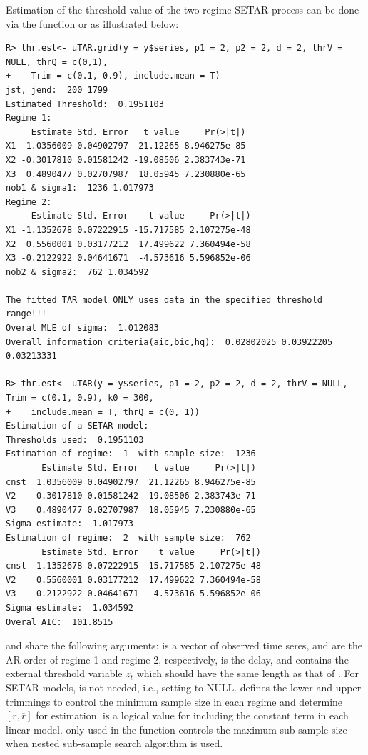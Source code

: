 Estimation of the threshold value of the two-regime SETAR process can be done via the
function  or  as illustrated below:
\begin{verbatim}
R> thr.est<- uTAR.grid(y = y$series, p1 = 2, p2 = 2, d = 2, thrV = NULL, thrQ = c(0,1),
+    Trim = c(0.1, 0.9), include.mean = T)
jst, jend:  200 1799 
Estimated Threshold:  0.1951103 
Regime 1:  
     Estimate Std. Error   t value     Pr(>|t|)
X1  1.0356009 0.04902797  21.12265 8.946275e-85
X2 -0.3017810 0.01581242 -19.08506 2.383743e-71
X3  0.4890477 0.02707987  18.05945 7.230880e-65
nob1 & sigma1:  1236 1.017973 
Regime 2:  
     Estimate Std. Error    t value     Pr(>|t|)
X1 -1.1352678 0.07222915 -15.717585 2.107275e-48
X2  0.5560001 0.03177212  17.499622 7.360494e-58
X3 -0.2122922 0.04641671  -4.573616 5.596852e-06
nob2 & sigma2:  762 1.034592 
  
The fitted TAR model ONLY uses data in the specified threshold range!!! 
Overal MLE of sigma:  1.012083 
Overall information criteria(aic,bic,hq):  0.02802025 0.03922205 0.03213331 

R> thr.est<- uTAR(y = y$series, p1 = 2, p2 = 2, d = 2, thrV = NULL, Trim = c(0.1, 0.9), k0 = 300,
+    include.mean = T, thrQ = c(0, 1))
Estimation of a SETAR model:  
Thresholds used:  0.1951103 
Estimation of regime:  1  with sample size:  1236 
       Estimate Std. Error   t value     Pr(>|t|)
cnst  1.0356009 0.04902797  21.12265 8.946275e-85
V2   -0.3017810 0.01581242 -19.08506 2.383743e-71
V3    0.4890477 0.02707987  18.05945 7.230880e-65
Sigma estimate:  1.017973 
Estimation of regime:  2  with sample size:  762 
       Estimate Std. Error    t value     Pr(>|t|)
cnst -1.1352678 0.07222915 -15.717585 2.107275e-48
V2    0.5560001 0.03177212  17.499622 7.360494e-58
V3   -0.2122922 0.04641671  -4.573616 5.596852e-06
Sigma estimate:  1.034592 
Overal AIC:  101.8515 
\end{verbatim}
 and  share the following arguments:  is a vector of observed time seres,  and  are the AR order of regime 1 and regime 2, respectively,  is the delay, and  contains the external threshold variable $z_{t}$ which should have the same length as that of . For SETAR models,  is not needed, i.e., setting  to NULL.  defines the lower and upper trimmings to control the minimum sample size in each regime and determine $[\underline{r}, \overline{r}]$ for estimation.   is a logical value for including
the constant term in each linear model.  only used in the  function controls the maximum sub-sample size when nested sub-sample search algorithm is used.


